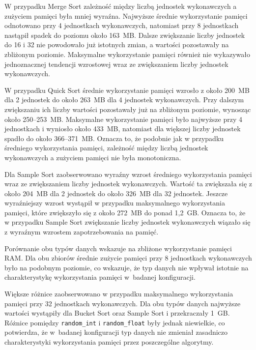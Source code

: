 W przypadku Merge Sort zależność między liczbą jednostek wykonawczych a zużyciem pamięci była mniej wyraźna. 
Najwyższe średnie wykorzystanie pamięci odnotowano przy 4 jednostkach wykonawczych, natomiast przy 8 jednostkach nastąpił spadek do poziomu około 163~MB. 
Dalsze zwiększanie liczby jednostek do 16 i 32 nie powodowało już istotnych zmian, a wartości pozostawały na zbliżonym poziomie. 
Maksymalne wykorzystanie pamięci również nie wykazywało jednoznacznej tendencji wzrostowej wraz ze zwiększaniem liczby jednostek wykonawczych.

W przypadku Quick Sort średnie wykorzystanie pamięci wzrosło z około 200~MB dla 2 jednostek do około 263~MB dla 4 jednostek wykonawczych. 
Przy dalszym zwiększaniu ich liczby wartości pozostawały już na zbliżonym poziomie, wynosząc około 250--253~MB. 
Maksymalne wykorzystanie pamięci było najwyższe przy 4 jednostkach i wyniosło około 433~MB, 
natomiast dla większej liczby jednostek spadło do około 366--371~MB. Oznacza to, że podobnie jak w przypadku średniego wykorzystania pamięci, 
zależność między liczbą jednostek wykonawczych a zużyciem pamięci nie była monotoniczna.

Dla Sample Sort zaobserwowano wyraźny wzrost średniego wykorzystania pamięci wraz ze zwiększaniem liczby jednostek wykonawczych. 
Wartość ta zwiększała się z około 204~MB dla 2 jednostek do około 326~MB dla 32 jednostek. 
Jeszcze wyraźniejszy wzrost wystąpił w przypadku maksymalnego wykorzystania pamięci, które zwiększyło się z około 272~MB do ponad 1,2~GB. 
Oznacza to, że w przypadku Sample Sort zwiększanie liczby jednostek wykonawczych wiązało się z wyraźnym wzrostem zapotrzebowania na pamięć.

Porównanie obu typów danych wskazuje na zbliżone wykorzystanie pamięci RAM. 
Dla obu zbiorów średnie zużycie pamięci przy 8 jednostkach wykonawczych było na podobnym poziomie, 
co wskazuje, że typ danych nie wpływał istotnie na charakterystykę wykorzystania pamięci w~badanej konfiguracji.

Większe różnice zaobserwowano w przypadku maksymalnego wykorzystania pamięci przy 32 jednostkach wykonawczych. 
Dla obu typów danych najwyższe wartości wystąpiły dla Bucket Sort oraz Sample Sort i przekraczały 1~GB. 
Różnice pomiędzy \texttt{random\_int} i \texttt{random\_float} były jednak niewielkie, co potwierdza, 
że w~badanej konfiguracji typ danych nie zmieniał zasadniczo charakterystyki wykorzystania pamięci przez poszczególne algorytmy.